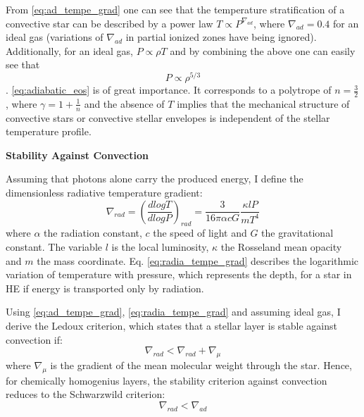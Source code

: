 From \cref{eq:ad_tempe_grad} one can see that the temperature stratification of a convective star can be described by a power law $T \propto P^{\nabla_{ad}}$, where $\nabla_{ad} = 0.4$ for an ideal gas \citep{pols2011stellar} (variations of $\nabla_{ad}$ in partial ionized zones have being ignored). Additionally, for an ideal gas, $P \propto \rho T$ and by combining the above one can easily see that
\begin{equation}\label{eq:adiabatic_eos}
    P \propto \rho^{5/3}
\end{equation}.
\cref{eq:adiabatic_eos} is of great importance. It corresponds to a polytrope of $n = \frac{3}{2}$, where $\gamma = 1+ \frac{1}{n}$ and the absence of $T$ implies that the mechanical structure of convective stars or convective stellar envelopes is independent of the stellar temperature profile. 

{\bf Stability Against Convection}

Assuming that photons alone carry the produced energy, I define the dimensionless radiative temperature gradient:
\begin{equation}\label{eq:radia_tempe_grad}
    \nabla_{rad} = \left ( \frac{d logT}{d logP} \right)_{rad} = \frac{3}{16 \pi \alpha c G} \frac{\kappa l P}{m T^4}
\end{equation}
where $\alpha$ the radiation constant, $c$ the speed of light and $G$ the gravitational constant. The variable $l$ is the local luminosity, $\kappa$ the Rosseland mean opacity and $m$ the mass coordinate. Eq. \eqref{eq:radia_tempe_grad} describes the logarithmic variation of temperature with pressure, which represents the depth, for a star in HE if energy is transported only by radiation.

Using \eqref{eq:ad_tempe_grad}, \eqref{eq:radia_tempe_grad}  and assuming ideal gas, I derive the  Ledoux criterion,  which states that a stellar layer is stable against convection if:
\begin{equation}\label{eq:Ledoux_criterion}
    \nabla_{rad} < \nabla_{rad} +  \nabla_{\mu}
\end{equation}
where $\nabla_{\mu}$ is the gradient of the mean molecular weight through the star. Hence, for chemically homogenius layers, the stability criterion against convection reduces to the Schwarzwild criterion:
\begin{equation}\label{eq:Schwarzwild_criterion}
    \nabla_{rad} < \nabla_{ad}
\end{equation}

